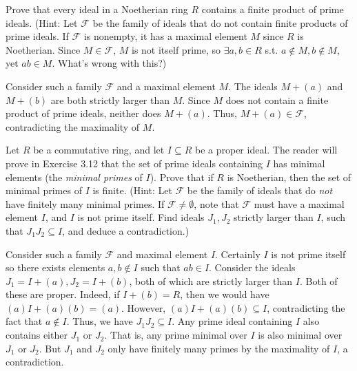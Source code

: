 \documentclass[../../master.tex]{subfiles}
\begin{document}
    \begin{problem}
        Prove that every ideal in a Noetherian ring $R$ contains a finite
        product of prime ideals. (Hint: Let $\mathscr{F}$ be the family of
        ideals that do not contain finite products of prime ideals. If
        $\mathscr{F}$ is nonempty, it has a maximal element $M$ since $R$ is
        Noetherian. Since $M \in \mathscr{F}$, $M$ is not itself prime, so
        $\exists a, b \in R$ s.t. $a \notin M, b \notin M$, yet $ab \in M$.
        What's wrong with this?)
    \end{problem}

    \begin{solution}
        Consider such a family $\mathscr{F}$ and a maximal element $M$. The
        ideals $M + (a)$ and $M + (b)$ are both strictly larger than $M$. Since
        $M$ does not contain a finite product of prime ideals, neither does $M +
        (a)$. Thus, $M + (a) \in \mathscr{F}$, contradicting the maximality of
        $M$.
    \end{solution}

    \begin{problem}
        Let $R$ be a commutative ring, and let $I \subseteq R$ be a proper
        ideal. The reader will prove in Exercise 3.12 that the set of prime
        ideals containing $I$ has minimal elements (the \textit{minimal primes}
        of $I$). Prove that if $R$ is Noetherian, then the set of minimal
        primes of $I$ is finite. (Hint: Let $\mathscr{F}$ be the family of
        ideals that do \textit{not} have finitely many minimal primes. If
        $\mathscr{F} \neq \emptyset$, note that $\mathscr{F}$ must have a
        maximal element $I$, and $I$ is not prime itself. Find ideals $J_1,
        J_2$ strictly larger than $I$, such that $J_1 J_2 \subseteq I$, and
        deduce a contradiction.)
    \end{problem}

    \begin{solution}
        Consider such a family $\mathscr{F}$ and maximal element $I$. Certainly
        $I$ is not prime itself so there exists elements $a, b \notin I$ such
        that $ab \in I$. Consider the ideals $J_1 = I + (a), J_2 = I + (b)$,
        both of which are strictly larger than $I$. Both of these are proper.
        Indeed, if $I + (b) = R$, then we would have $(a) I + (a) (b) = (a)$.
        However, $(a) I + (a) (b) \subseteq I$, contradicting the fact that $a
        \notin I$. Thus, we have $J_1 J_2 \subseteq I$. Any prime
        ideal containing $I$ also contains either $J_1$ or $J_2$. That is, any
        prime minimal over $I$ is also minimal over $J_1$ or $J_2$. But $J_1$
        and $J_2$ only have finitely many primes by the maximality of $I$, a
        contradiction.
    \end{solution} 
\end{document}

